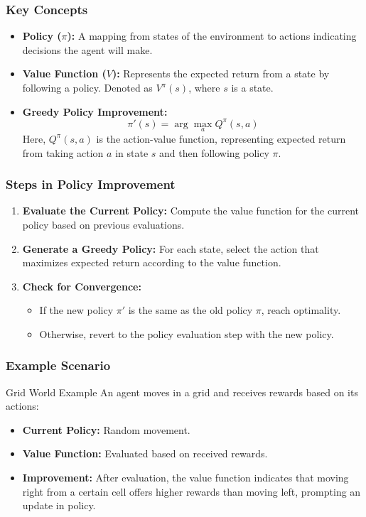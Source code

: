 \documentclass[aspectratio=169]{beamer}
\begin{document}
\begin{frame}[fragile]
  \frametitle{Key Concepts}
  \begin{itemize}
    \item \textbf{Policy ($\pi$):} A mapping from states of the environment to actions indicating decisions the agent will make.
    
    \item \textbf{Value Function ($V$):} Represents the expected return from a state by following a policy. Denoted as $V^{\pi}(s)$, where $s$ is a state.
    
    \item \textbf{Greedy Policy Improvement:} 
      \begin{equation}
      \pi'(s) = \arg\max_a Q^{\pi}(s, a)
      \end{equation}
      Here, $Q^{\pi}(s, a)$ is the action-value function, representing expected return from taking action $a$ in state $s$ and then following policy $\pi$.
  \end{itemize}
\end{frame}

\begin{frame}[fragile]
  \frametitle{Steps in Policy Improvement}
  \begin{enumerate}
    \item \textbf{Evaluate the Current Policy:} Compute the value function for the current policy based on previous evaluations.
    
    \item \textbf{Generate a Greedy Policy:} For each state, select the action that maximizes expected return according to the value function. 
    
    \item \textbf{Check for Convergence:} 
    \begin{itemize}
      \item If the new policy $\pi'$ is the same as the old policy $\pi$, reach optimality. 
      \item Otherwise, revert to the policy evaluation step with the new policy.
    \end{itemize}
  \end{enumerate}
\end{frame}

\begin{frame}[fragile]
  \frametitle{Example Scenario}
  \begin{block}{Grid World Example}
    An agent moves in a grid and receives rewards based on its actions:
    \begin{itemize}
      \item \textbf{Current Policy:} Random movement.
      \item \textbf{Value Function:} Evaluated based on received rewards.
      \item \textbf{Improvement:} After evaluation, the value function indicates that moving right from a certain cell offers higher rewards than moving left, prompting an update in policy.
    \end{itemize}
  \end{block}
\end{frame}
\end{document}
